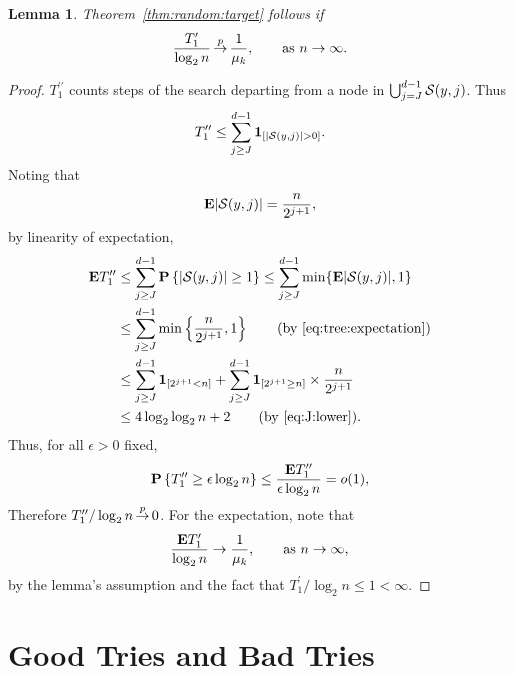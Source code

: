\documentclass{article}
\newcommand{\Thead}{{T_1^\prime}}
\newcommand{\Ttail}{{T_1^{\prime\prime}}}
\newcommand\cS{{\cal S}}
\newcommand{\e}{{\textbf E}}
\newcommand{\p}[1]{{\textbf P}\left\{#1\right\}}
\newcommand\inprobHIGH{\,{\buildrel p \over \rightarrow}\,}
\newcommand\inprob{{\inprobHIGH}}
\newcommand{\ind}[1]{{\textbf{1}_{\left[#1\right]}}}
\newtheorem{lemma}{Lemma}
\begin{document}
\begin{lemma}
    Theorem~\ref{thm:random:target} follows if 
    $$
    \frac {\Thead}{\log_2 n} \inprob \frac 1 {\mu_k}, \qquad \text{as } n \to \infty.
    $$
    \label{lem:tail}
\end{lemma}
\begin{proof}
    \added{Let \(\Ttail = T_1 - \Thead\).}
    $\Ttail$ counts steps of the search departing from a node 
    in  $\bigcup_{j = J}^{d-1} \cS(y,j)$.  Thus
    $$
    \Ttail \le \sum_{j \ge J}^{d-1} \ind{|\cS(y,j)| > 0}.
    $$
    Noting that
    \begin{align}
        \e |\cS(y,j)| = \frac{n}{2^{j+1}},
        \label{eq:tree:expectation}
    \end{align}
    by linearity of expectation, 
    \begin{align*}
        \e \Ttail
        & \le \sum_{j \ge J}^{d-1} \p{|\cS(y,j)| \ge 1} 
        \le \sum_{j \ge J}^{d-1} \min\{\e |\cS(y,j)|, 1\}\\
        & \le \sum_{j \ge J}^{d-1} \min\left\{\frac{n}{2^{j+1}}, 1\right\} 
        \qquad (\text{by \eqref{eq:tree:expectation}})\\
        & \le \sum_{j \ge J}^{d-1} \ind{2^{j+1}<n} + \sum_{j \ge J}^{d-1}
        \ind{2^{j+1} \ge n} \times \frac{n}{2^{j+1}}\\
        & \le 4 \log_2 \log_2 n + 2 \qquad (\text{by \eqref{eq:J:lower}}).
    \end{align*}
    Thus, for all $\epsilon > 0$ fixed, 
    $$
    \p{\Ttail \ge \epsilon \log_2 n} 
    \le \frac{\e \Ttail}{\epsilon \log_2 n} 
    = o(1),
    $$
    Therefore $\Ttail/\log_2 n \inprob 0$. For the expectation, note that
    $$
\frac {\e{\Thead}} {\log_2 n}  \to \frac{1}{\mu_k}, \qquad \text{as
    } n \to \infty,
    $$
    by the lemma's assumption and the fact that $\Thead / \log_2 n \le 1 <
    \infty$.
\end{proof}

\section{Good Tries and Bad Tries}
\end{document}
